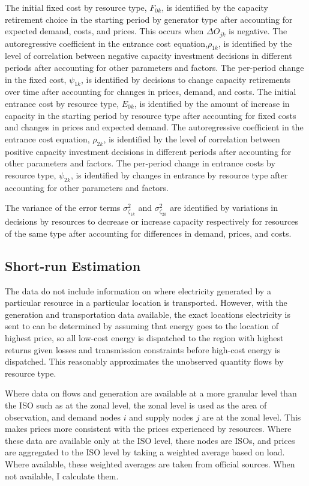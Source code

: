 \documentclass[12pt]{article}
\begin{document}
The initial fixed cost by resource type, $F_{0k}$, is identified by the capacity retirement choice in the starting period by generator type after accounting for expected demand, costs, and prices. This occurs when $\Delta O_{jk}$ is negative. The autoregressive coefficient in the entrance cost equation,$\rho_{1k}$, is identified by the level of correlation between negative capacity investment decisions in different periods after accounting for other parameters and factors. The per-period change in the fixed cost, $\psi_{1k}$, is identified by decisions to change capacity retirements over time after accounting for changes in prices, demand, and costs. The initial entrance cost by resource type, $E_{0k}$, is identified by the amount of increase in capacity in the starting period by resource type after accounting for fixed costs and changes in prices and expected demand. The autoregressive coefficient in the entrance cost equation, $\rho_{2k}$, is identified by the level of correlation between positive capacity investment decisions in different periods after accounting for other parameters and factors. The per-period change in entrance costs by resource type, $\psi_{2k}$, is identified by changes in entrance by resource type after accounting for other parameters and factors.

The variance of the error terms $\sigma_{\zeta_{1k}}^2$ and $\sigma_{\zeta_{2k}}^2$ are identified by variations in decisions by resources to decrease or increase capacity respectively for resources of the same type after accounting for differences in demand, prices, and costs.

\subsection{Short-run Estimation}

The data do not include information on where electricity generated by a particular resource in a particular location is transported. However, with the generation and transportation data available, the exact locations electricity is sent to can be determined by assuming that energy goes to the location of highest price, so all low-cost energy is dispatched to the region with highest returns given losses and transmission constraints before high-cost energy is dispatched. This reasonably approximates the unobserved quantity flows by resource type.

Where data on flows and generation are available at a more granular level than the ISO such as at the zonal level, the zonal level is used as the area of observation, and demand nodes $i$ and supply nodes $j$ are at the zonal level. This makes prices more consistent with the prices experienced by resources. Where these data are available only at the ISO level, these nodes are ISOs, and prices are aggregated to the ISO level by taking a weighted average based on load. Where available, these weighted averages are taken from official sources. When not available, I calculate them.
\end{document}
